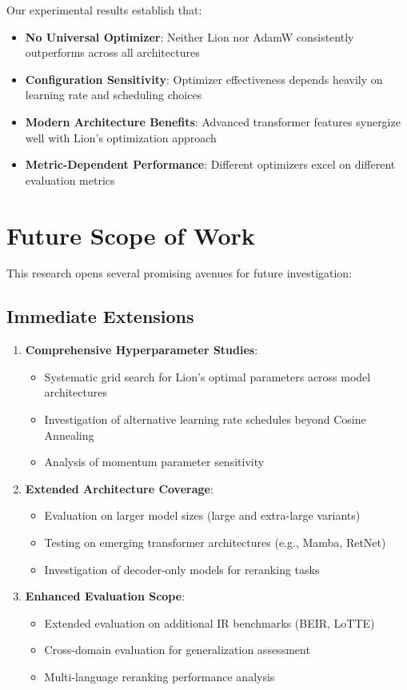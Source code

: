 Our experimental results establish that:
\begin{itemize}
    \item \textbf{No Universal Optimizer}: Neither Lion nor AdamW consistently outperforms across all architectures
    \item \textbf{Configuration Sensitivity}: Optimizer effectiveness depends heavily on learning rate and scheduling choices
    \item \textbf{Modern Architecture Benefits}: Advanced transformer features synergize well with Lion's optimization approach
    \item \textbf{Metric-Dependent Performance}: Different optimizers excel on different evaluation metrics
\end{itemize}

\section{Future Scope of Work}

This research opens several promising avenues for future investigation:

\subsection{Immediate Extensions}

\begin{enumerate}
    \item \textbf{Comprehensive Hyperparameter Studies}:
    \begin{itemize}
        \item Systematic grid search for Lion's optimal parameters across model architectures
        \item Investigation of alternative learning rate schedules beyond Cosine Annealing
        \item Analysis of momentum parameter sensitivity
    \end{itemize}

    \item \textbf{Extended Architecture Coverage}:
    \begin{itemize}
        \item Evaluation on larger model sizes (large and extra-large variants)
        \item Testing on emerging transformer architectures (e.g., Mamba, RetNet)
        \item Investigation of decoder-only models for reranking tasks
    \end{itemize}

    \item \textbf{Enhanced Evaluation Scope}:
    \begin{itemize}
        \item Extended evaluation on additional IR benchmarks (BEIR, LoTTE)
        \item Cross-domain evaluation for generalization assessment
        \item Multi-language reranking performance analysis
    \end{itemize}
\end{enumerate}

